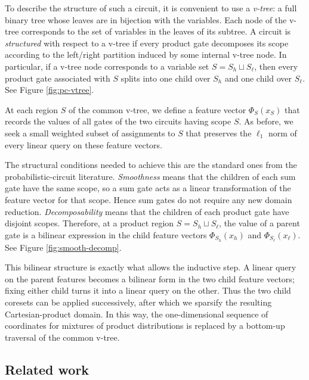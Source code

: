 \documentclass{article}
\begin{document}
To describe the structure of such a circuit, it is convenient to use a
\emph{v-tree}: a full binary tree whose leaves are in bijection with the
variables.  Each node of the v-tree corresponds to the set of variables
in the leaves of its subtree.  A circuit is \emph{structured} with
respect to a v-tree if every product gate decomposes its scope according
to the left/right partition induced by some internal v-tree node.  In
particular, if a v-tree node corresponds to a variable set
$S=S_h\sqcup S_\ell$, then every product gate associated with $S$
splits into one child over $S_h$ and one child over $S_\ell$. See Figure \ref{fig:pc-vtree}.

At each region $S$ of the common v-tree, we define a feature vector
$\Phi_S(x_S)$ that records the values of all gates of the two circuits
having scope $S$.  
As before, we seek a small weighted subset of
assignments to $S$ that preserves the $\ell_1$ norm of every linear
query on these feature vectors.

The structural conditions needed to achieve this are the standard ones from the probabilistic-circuit literature.  
\emph{Smoothness} means that the
children of each sum gate have the same scope, so a sum gate acts as a
linear transformation of the feature vector for that scope.  Hence sum
gates do not require any new domain reduction.  \emph{Decomposability}
means that the children of each product gate have disjoint scopes.
Therefore, at a product region $S=S_h\sqcup S_\ell$, the value of a
parent gate is a bilinear expression in the child feature vectors
$\Phi_{S_h}(x_h)$ and $\Phi_{S_\ell}(x_\ell)$. See Figure \ref{fig:smooth-decomp}.

This bilinear structure is exactly what allows the inductive step.  A
linear query on the parent features becomes a bilinear form in the two
child feature vectors; fixing either child turns it into a linear query
on the other.  Thus the two child coresets can be applied successively,
after which we sparsify the resulting Cartesian-product domain.  In this
way, the one-dimensional sequence of coordinates for mixtures of product
distributions is replaced by a bottom-up traversal of the common v-tree.

\subsection{Related work}
\label{sec:related-work}
\end{document}
